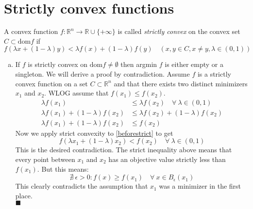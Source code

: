 \documentclass{article}
\begin{document}
	\section{Strictly convex functions}
	A convex function $f: \mathbb R^n \rightarrow \mathbb R \cup \{+\infty\}$ is called \textit{strictly convex} on the convex set $C \subset \mathrm{dom} f$ if 
	\begin{equation}\label{strict}
		f(\lambda x+ (1-\lambda)y) < \lambda f(x) + (1-\lambda)f(y) \quad (x,y \in C, x\neq y, \lambda \in (0,1))
	\end{equation}
	\begin{enumerate}[(a)]
		\item If $f$ is strictly convex on $\mathrm{dom} f \neq \emptyset $ then argmin $f$ is either empty or a singleton. We will derive a proof by contradiction. Assume $f$ is a strictly convex function on a set $C\subset \mathbb R^n$ and that there exists two distinct minimizers $x_1$ and $x_2$. WLOG assume that $f(x_1) \leq f(x_2)$. 
		\begin{align}
			\lambda f(x_1) &\leq \lambda f(x_2) \quad \forall \ \lambda \in (0,1)\\
			\lambda f(x_1) + (1-\lambda)f(x_2) &\leq \lambda f(x_2) + (1-\lambda)f(x_2)\\
			\lambda f(x_1) + (1-\lambda)f(x_2) &\leq f(x_2) \label{beforestrict}
		\end{align}
		Now we apply strict convexity to \ref{beforestrict} to get 
		\begin{equation}\label{contradiction}
			f(\lambda x_1 + (1-\lambda)x_2) < f(x_2) \quad \forall \ \lambda \in (0,1)
		\end{equation}
		This is the desired contradiction. The strict inequality above means that every point between $x_1$ and $x_2$ has an objective value strictly less than $f(x_1)$. But this means: 
		\begin{equation}
			\nexists \ \epsilon > 0 : f(x) \geq f(x_1) \quad \forall \ x\in B_\epsilon(x_1)
		\end{equation}
		This clearly contradicts the assumption that $x_1$ was a minimizer in the first place.\\
		$\blacksquare$
		

\end{enumerate}
\end{document}
